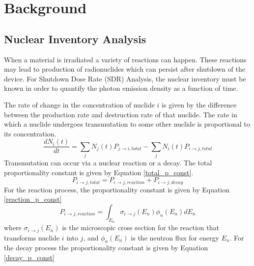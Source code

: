 \section{Background}


\subsection{Nuclear Inventory Analysis}
When a material is irradiated a variety of reactions can happen. These 
reactions may lead to production of radionuclides which can persist
after shutdown of the device. For Shutdown Dose Rate (SDR) Analysis, 
the nuclear inventory must be known
in order to quantify the photon emission density as a function of time.

The rate of change in the concentration of nuclide $i$ is given by the 
difference between the production rate and destruction rate of that nuclide.
The rate in which a nuclide undergoes transmutation to some other nuclide
is proportional to its concentration. 
\begin{equation}\label{rate_change_i}
  \frac{dN_{i}(t)}{dt} = \sum_{j} N_{j}(t)P_{j \rightarrow i, total}
  - \sum_{j} N_{i}(t)P_{i \rightarrow j, total}
\end{equation}
Transmutation can occur via a nuclear reaction or a decay. The total
proportionality constant is given by Equation \ref{total_p_const}.
\begin{equation}\label{total_p_const}
  P_{i \rightarrow j, total} = P_{i \rightarrow j, reaction } +
  P_{i \rightarrow j, decay}
\end{equation}
For the reaction process, the proportionality constant is given by
Equation \ref{reaction_p_const}
\begin{equation}\label{reaction_p_const}
  P_{i \rightarrow j, reaction } =
  \int_{E_{n}} \sigma_{i \rightarrow j}(E_{n})
  \phi_{n}(E_n)dE_{n}
\end{equation}
where $\sigma_{i \rightarrow j}(E_{n})$ is the microscopic cross
section for the reaction that transforms nuclide $i$ into $j$, and
 $\phi_{n}(E_{n})$ is the neutron flux for energy $E_{n}$.
For the decay process the proportionality constant is given by Equation
\ref{decay_p_const}

